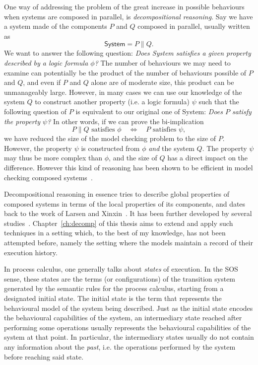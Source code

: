One way of addressing the problem of the great increase in possible behaviours
when systems are composed in parallel, is \emph{decompositional reasoning}. Say
we have a system made of the components $P$ and $Q$ composed in parallel, 
usually written as
\[
    \textsf{System} = P \parallel Q.
\]
We want to answer the following question: 
\emph{Does \textsf{System} satisfies a given property described by a
logic formula $\phi$?} 
The number of behaviours we may need to
examine can potentially be the product of the number of behaviours possible of $P$ and $Q$,
and even if $P$ and $Q$ alone are of moderate size, this product can be unmanageably large.
However, in many cases we can use our knowledge of the system $Q$ to construct
another property (i.e. a logic formula) $\psi$ such that the following question
of $P$
is equivalent to our original one of \textsf{System}:
\emph{Does $P$ satisfy the property $\psi$?} In other words, if we can prove the
bi-implication
\[
    P\parallel Q \textrm{ satisfies } \phi \quad\Leftrightarrow\quad
    P \textrm{ satisfies } \psi,
\]
we have reduced the size of the model checking problem to the size of $P$.
%
However, the property $\psi$ is constructed from $\phi$ \emph{and} the system $Q$.
The property $\psi$ may thus be more complex than $\phi$, and the size of $Q$ has
a direct impact on the difference. However this kind of reasoning has been shown
to be efficient in model checking composed systems~\cite{Andersen95,LaroussinieL98}.

Decompositional reasoning in essence tries to describe global properties of
composed systems in terms of the local properties of its components, 
and dates back to the work of Larsen and Xinxin~\cite{Larsen91}.
It has been further developed by several studies~\cite{Giannakopoulou05,Xie05,Andersen95,LaroussinieL95}.
Chapter~\ref{ch:decomp} of this thesis aims to extend and apply such techniques
in a setting which, to the best of my knowledge, has not been attempted before,
namely the setting where the models maintain a record of their execution history.

\vspace{1em}

In process calculus, one generally talks about \emph{states} of execution. In the
SOS sense, these states are the terms (or configurations) of the transition system
generated by the semantic rules for the process calculus, starting from a designated
initial state. The initial state is the term that represents the behavioural model
of the system being described. Just as the initial state encodes the behavioural
capabilities of the system, an intermediary state reached after performing some
operations usually represents the behavioural capabilities of the system at that point.
In particular, the intermediary states usually do not contain any information about
the \emph{past}, i.e. the operations performed by the system before reaching said state.

